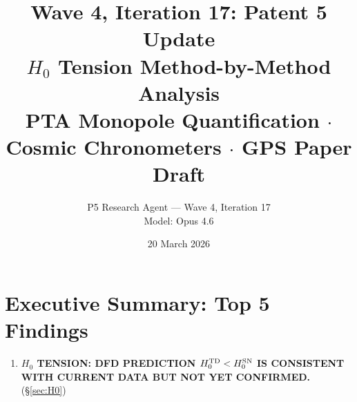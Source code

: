\documentclass[11pt,a4paper]{article}
\title{\textbf{Wave 4, Iteration 17: Patent 5 Update}\\[0.5em]
\large $H_0$ Tension Method-by-Method Analysis\\[0.3em]
\large PTA Monopole Quantification $\cdot$ Cosmic Chronometers $\cdot$ GPS Paper Draft}
\author{P5 Research Agent --- Wave 4, Iteration 17\\Model: Opus 4.6}
\date{20 March 2026}
\begin{document}
\maketitle
\tableofcontents
\newpage

\section*{Executive Summary: Top 5 Findings}

\begin{tcolorbox}[colback=yellow!5!white, colframe=red!70!black,
  title=\textbf{W4i17 TOP 5 FINDINGS --- RANKED BY IMPACT}]

\begin{enumerate}

\item \textbf{$H_0$ TENSION: DFD PREDICTION $H_0^{\rm TD} < H_0^{\rm SN}$
  IS CONSISTENT WITH CURRENT DATA BUT NOT YET CONFIRMED.}
  (\S\ref{sec:H0})


\end{enumerate}
\end{tcolorbox}
\end{document}
